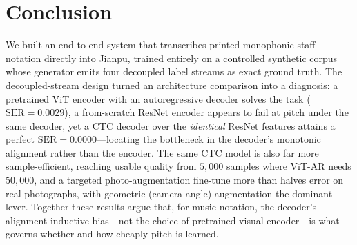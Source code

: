\section{Conclusion}
\label{section:conclusion}

We built an end-to-end system that transcribes printed monophonic staff notation
directly into Jianpu, trained entirely on a controlled synthetic corpus whose
generator emits four decoupled label streams as exact ground truth. The
decoupled-stream design turned an architecture comparison into a diagnosis: a
pretrained ViT encoder with an autoregressive decoder solves the task
($\mathrm{SER}=0.0029$), a from-scratch ResNet encoder appears to fail at pitch
under the same decoder, yet a CTC decoder over the \emph{identical} ResNet
features attains a perfect $\mathrm{SER}=0.0000$---locating the bottleneck in the
decoder's monotonic alignment rather than the encoder. The same CTC model is also
far more sample-efficient, reaching usable quality from $5{,}000$ samples where
ViT-AR needs $50{,}000$, and a targeted photo-augmentation fine-tune more than
halves error on real photographs, with geometric (camera-angle) augmentation the
dominant lever. Together these results argue that, for music notation, the
decoder's alignment inductive bias---not the choice of pretrained visual
encoder---is what governs whether and how cheaply pitch is learned.
